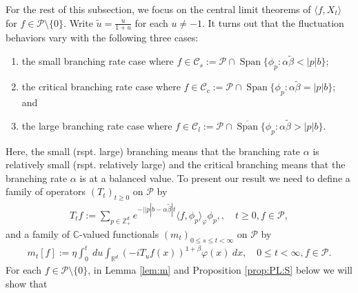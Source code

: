 \documentclass[12pt,a4paper]{amsart}
\theoremstyle{plain}
\theoremstyle{definition}
\numberwithin{equation}{section}
\begin{document}
For the rest of this subsection, we focus on the central limit theorems of $\langle f, X_t\rangle$ for $f\in \mathcal P\setminus \{0\}$.
Write $\tilde u = \frac{u}{ 1+ u}$ for each $u \neq -1$.
It turns out that the fluctuation behaviors vary with the following three cases:
\begin{enumerate}
\item
  the small branching rate case where $f \in \mathcal C_s   := \mathcal P \cap \operatorname{Span} \{ \phi_p: \alpha \tilde \beta < |p| b \}$; 
\item
  the critical branching rate case where $f \in \mathcal C_c   := \mathcal P \cap \operatorname{Span} \{ \phi_p : \alpha \tilde \beta = |p| b \} $; and
\item
  the large branching rate case  where $f \in \mathcal C_l   := \mathcal P \cap \overline{\operatorname{Span}} \{ \phi_p: \alpha \tilde \beta > |p| b \}$.
\end{enumerate}
Here, the small (rspt. large) branching means that the branching rate $\alpha$ is relatively small (rspt. relatively large) and the critical branching means that the branching rate $\alpha$ is at a balanced value.
To present our result we need to define a family of operators $(T_t)_{t\geq 0}$ on $\mathcal P$ by
    \begin{align}
      \label{eq:I:R:1}
      T_t f 
      := \sum_{p \in \mathbb Z_+^d} e^{-| |p|b - \alpha \tilde \beta |t} \langle f, \phi_p \rangle_{\varphi} \phi_p,
      ,\quad t\geq 0, f\in \mathcal P, 
    \end{align}
    and a family of $\mathbb C$-valued functionals $(m_t)_{0 \leq s \leq t < \infty}$ on $\mathcal P$ by
    \begin{align}
      \label{eq:I:R:2}
      m_t[f]
      := \eta \int_0^t ~du \int_{\mathbb R^d} (-iT_u f(x))^{1+\beta} \varphi(x) ~dx 
      , \quad 0 \leq t< \infty, f\in \mathcal P. 
    \end{align}
    For each $f\in \mathcal P\setminus \{0\}$, in Lemma \ref{lem:m} and Proposition \ref{prop:PL:S} below we will show that
\end{document}
